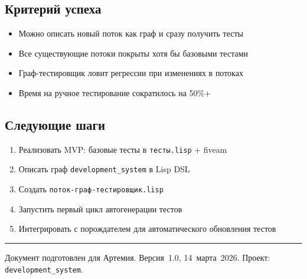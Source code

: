 \documentclass[12pt, a4paper, twoside]{article}
\begin{document}
\subsection{Критерий успеха}

\begin{successbox}[title={Через месяц система считается успешной, если:}]
\begin{itemize}[leftmargin=1em]
  \item Можно описать новый поток как граф и сразу получить тесты
  \item Все существующие потоки покрыты хотя бы базовыми тестами
  \item Граф-тестировщик ловит регрессии при изменениях в потоках
  \item Время на ручное тестирование сократилось на 50\%+
\end{itemize}
\end{successbox}

\subsection{Следующие шаги}

\begin{enumerate}[leftmargin=1.5em]
  \item Реализовать MVP: базовые тесты в \texttt{тесты.lisp} + fiveam
  \item Описать граф \texttt{development\_system} в Lisp DSL
  \item Создать \texttt{поток-граф-тестировщик.lisp}
  \item Запустить первый цикл автогенерации тестов
  \item Интегрировать с порождателем для автоматического обновления тестов
\end{enumerate}

\vspace{1cm}
\hrule
\vspace{4mm}
{\small\color{MidGray}
  Документ подготовлен для Артемия.
  Версия~1.0, 14~марта~2026.
  Проект: \texttt{development\_system}.
}
\end{document}
